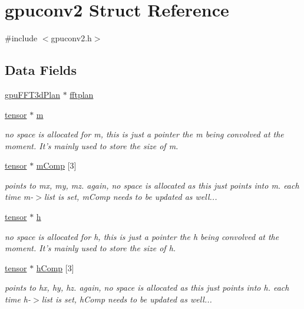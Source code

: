 \hypertarget{structgpuconv2}{
\section{gpuconv2 Struct Reference}
\label{structgpuconv2}
}


{\ttfamily \#include $<$gpuconv2.h$>$}

\subsection*{Data Fields}
\begin{DoxyCompactItemize}
\item 
\hyperlink{structgpuFFT3dPlan}{gpuFFT3dPlan} $\ast$ \hyperlink{structgpuconv2_adcd4ad6d8d98a95c99e698415a3cc058}{fftplan}
\item 
\hyperlink{structtensor}{tensor} $\ast$ \hyperlink{structgpuconv2_a1dcf396307b4b1787d139c2f7707a267}{m}
\begin{DoxyCompactList}\small\item\em no space is allocated for m, this is just a pointer the m being convolved at the moment. It's mainly used to store the size of m. \item\end{DoxyCompactList}\item 
\hyperlink{structtensor}{tensor} $\ast$ \hyperlink{structgpuconv2_acdabd23ef571842ec90007196a2e0d17}{mComp} \mbox{[}3\mbox{]}
\begin{DoxyCompactList}\small\item\em points to mx, my, mz. again, no space is allocated as this just points into m. each time m-\/$>$list is set, mComp needs to be updated as well... \item\end{DoxyCompactList}\item 
\hyperlink{structtensor}{tensor} $\ast$ \hyperlink{structgpuconv2_ae55b0700d3d86df36914b511fcaa25a0}{h}
\begin{DoxyCompactList}\small\item\em no space is allocated for h, this is just a pointer the h being convolved at the moment. It's mainly used to store the size of h. \item\end{DoxyCompactList}\item 
\hyperlink{structtensor}{tensor} $\ast$ \hyperlink{structgpuconv2_a49eb6e78bd054b216c5d88a960eecf77}{hComp} \mbox{[}3\mbox{]}
\begin{DoxyCompactList}\small\item\em points to hx, hy, hz. again, no space is allocated as this just points into h. each time h-\/$>$list is set, hComp needs to be updated as well... \item\end{DoxyCompactList}\item 

\end{DoxyCompactItemize}
